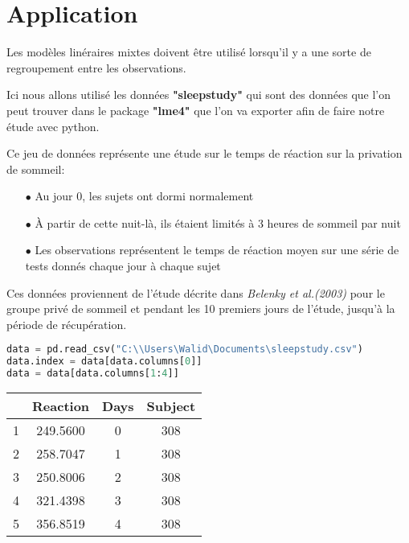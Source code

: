 \newpage

\section{Application}
Les modèles linéraires mixtes doivent être utilisé lorsqu'il y a une sorte de regroupement entre les observations. 

Ici nous allons utilisé les données \textbf{"sleepstudy"} qui sont des données que l'on peut trouver dans le package \textbf{"lme4"} que l'on va exporter afin de faire notre étude avec python.

Ce jeu de données représente une étude sur le temps de réaction sur la privation de sommeil:

\begin{itemize}
    \item[$\bullet$] Au jour 0, les sujets ont dormi normalement
    
    \item[$\bullet$] À partir de cette nuit-là, ils étaient limités à 3 heures de sommeil par nuit
    
    \item[$\bullet$] Les observations représentent le temps de réaction moyen sur une série de tests donnés chaque jour à chaque sujet
\end{itemize}

Ces données proviennent de l'étude décrite dans \textit{Belenky et al.(2003)}  pour le groupe privé de sommeil et pendant les 10 premiers jours de l'étude, jusqu'à la période de récupération.

\begin{lstlisting}[language=Python]
data = pd.read_csv("C:\\Users\Walid\Documents\sleepstudy.csv")
data.index = data[data.columns[0]]
data = data[data.columns[1:4]]
\end{lstlisting}

\begin{center}
\begin{tabular}{ c c c c }
\hline
 & Reaction & Days & Subject \\
\hline
1 & 249.5600 & 0 & 308 \\
2 & 258.7047 & 1 & 308 \\
3 & 250.8006 & 2 & 308 \\
4 & 321.4398 & 3 & 308 \\
5 & 356.8519 & 4 & 308 \\
\hline
\end{tabular}
\end{center}

